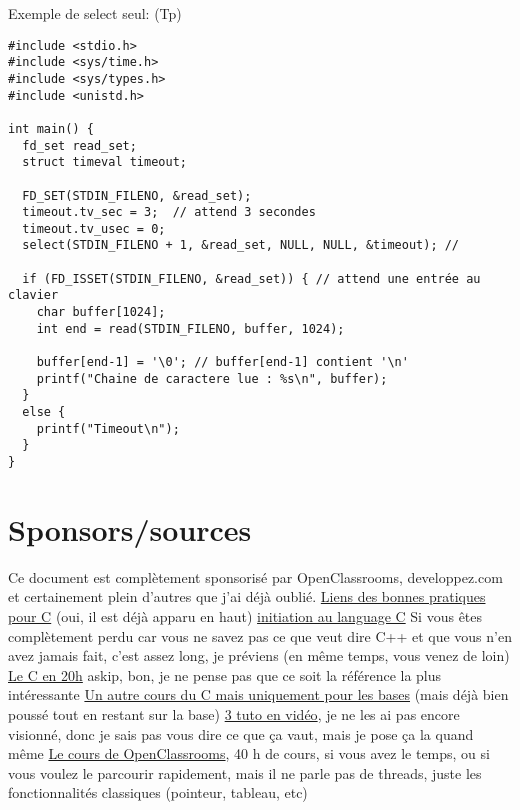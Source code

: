 \documentclass[a4paper]{article}
\begin{document}
Exemple de select seul: (Tp)
\begin{lstlisting}
#include <stdio.h>
#include <sys/time.h>
#include <sys/types.h>
#include <unistd.h>

int main() {
  fd_set read_set;
  struct timeval timeout;

  FD_SET(STDIN_FILENO, &read_set);
  timeout.tv_sec = 3;  // attend 3 secondes
  timeout.tv_usec = 0;
  select(STDIN_FILENO + 1, &read_set, NULL, NULL, &timeout); //

  if (FD_ISSET(STDIN_FILENO, &read_set)) { // attend une entrée au clavier
    char buffer[1024];
    int end = read(STDIN_FILENO, buffer, 1024);

    buffer[end-1] = '\0'; // buffer[end-1] contient '\n'
    printf("Chaine de caractere lue : %s\n", buffer);
  }
  else {
    printf("Timeout\n");
  }
}
\end{lstlisting}
\section{Sponsors/sources}
Ce document est complètement sponsorisé par OpenClassrooms, developpez.com et certainement plein d'autres que j'ai déjà oublié.\newline
\href{http://emmanuel-delahaye.developpez.com/tutoriels/c/bonnes-pratiques-codage-c/#LI-A}{Liens des bonnes pratiques pour C} (oui, il est déjà apparu en haut)\newline
\href{http://melem.developpez.com/tutoriels/langage-c/initiation-langage-c/}{initiation au language C} Si vous êtes complètement perdu car vous ne savez pas ce que veut dire C++ et que vous n'en avez jamais fait, c'est assez long, je préviens (en même temps, vous venez de loin)\newline
\href{https://c.developpez.com/cours/20-heures/}{Le C en 20h} askip, bon, je ne pense pas que ce soit la référence la plus intéressante\newline
\href{https://c.developpez.com/cours/poly-c/?page=page_1}{Un autre cours du C mais uniquement pour les bases} (mais déjà bien poussé tout en restant sur la base)\newline
\href{https://fr.tuto.com/langage-c/}{3 tuto en vidéo}, je ne les ai pas encore visionné, donc je sais pas vous dire ce que ça vaut, mais je pose ça la quand même\newline
\href{https://openclassrooms.com/courses/apprenez-a-programmer-en-c}{Le cours de OpenClassrooms}, 40 h de cours, si vous avez le temps, ou si vous voulez le parcourir rapidement, mais il ne parle pas de threads, juste les fonctionnalités classiques (pointeur, tableau, etc)
\end{document}
